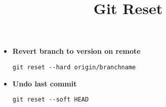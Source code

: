 \documentclass{../template/texnote}
\title{Git Reset}
\begin{document}
    \maketitle {}
	\begin{itemize}
		\item \textbf{Revert branch to version on remote}

\verb|git reset --hard origin/branchname|

		\item \textbf{Undo last commit}

\verb|git reset --soft HEAD|
	\end{itemize}

    \printbibliography
\end{document}
